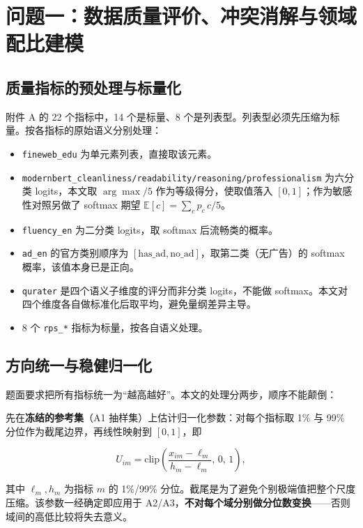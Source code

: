 \section{问题一：数据质量评价、冲突消解与领域配比建模}

\subsection{质量指标的预处理与标量化}

附件 A 的 22 个指标中，14 个是标量、8 个是列表型。列表型必须先压缩为标量。按各指标的原始语义分别处理：

\begin{itemize}[leftmargin=2em,itemsep=2pt]
\item \texttt{fineweb\_edu} 为单元素列表，直接取该元素。
\item \texttt{modernbert\_cleanliness/readability/reasoning/professionalism} 为六分类 logits，本文取 $\arg\max/5$ 作为等级得分，使取值落入 $[0,1]$；作为敏感性对照另做了 softmax 期望 $\mathbb{E}[c]=\sum_c p_c\,c/5$。
\item \texttt{fluency\_en} 为二分类 logits，取 softmax 后流畅类的概率。
\item \texttt{ad\_en} 的官方类别顺序为 $[\text{has\_ad},\text{no\_ad}]$，取第二类（无广告）的 softmax 概率，该值本身已是正向。
\item \texttt{qurater} 是四个语义子维度的评分而非分类 logits，不能做 softmax。本文对四个维度各自做标准化后取平均，避免量纲差异主导。
\item 8 个 \texttt{rps\_*} 指标为标量，按各自语义处理。
\end{itemize}

\subsection{方向统一与稳健归一化}

题面要求把所有指标统一为``越高越好''。本文的处理分两步，顺序不能颠倒：

先在\textbf{冻结的参考集}（A1 抽样集）上估计归一化参数：对每个指标取 1\% 与 99\% 分位作为截尾边界，再线性映射到 $[0,1]$，即

\begin{equation}
U_{im}=\mathrm{clip}\!\left(\frac{x_{im}-\ell_m}{h_m-\ell_m},\,0,\,1\right),
\end{equation}

其中 $\ell_m,h_m$ 为指标 $m$ 的 1\%/99\% 分位。截尾是为了避免个别极端值把整个尺度压缩。该参数一经确定即应用于 A2/A3，\textbf{不对每个域分别做分位数变换}——否则域间的高低比较将失去意义。

